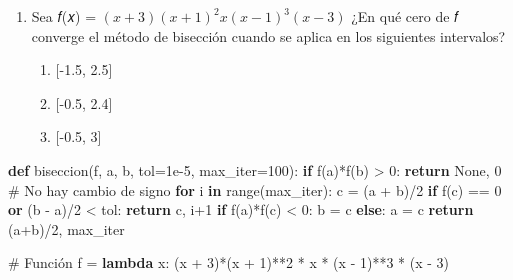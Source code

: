 \documentclass[
  english,
  letterpaper,
  DIV=11,
  numbers=noendperiod]{scrartcl}
\newenvironment{Shaded}{\begin{snugshade}}{\end{snugshade}}
\newcommand{\BuiltInTok}[1]{\textcolor[rgb]{0.00,0.23,0.31}{#1}}
\newcommand{\CommentTok}[1]{\textcolor[rgb]{0.37,0.37,0.37}{#1}}
\newcommand{\ControlFlowTok}[1]{\textcolor[rgb]{0.00,0.23,0.31}{\textbf{#1}}}
\newcommand{\DecValTok}[1]{\textcolor[rgb]{0.68,0.00,0.00}{#1}}
\newcommand{\FloatTok}[1]{\textcolor[rgb]{0.68,0.00,0.00}{#1}}
\newcommand{\KeywordTok}[1]{\textcolor[rgb]{0.00,0.23,0.31}{\textbf{#1}}}
\newcommand{\NormalTok}[1]{\textcolor[rgb]{0.00,0.23,0.31}{#1}}
\newcommand{\OperatorTok}[1]{\textcolor[rgb]{0.37,0.37,0.37}{#1}}
\newcommand{\VariableTok}[1]{\textcolor[rgb]{0.07,0.07,0.07}{#1}}
\begin{document}
\begin{enumerate}
\def\labelenumi{\arabic{enumi}.}
\setcounter{enumi}{4}
\item
  Sea 𝑓(𝑥) = \((𝑥 + 3)(𝑥 + 1)^2 x (x-1)^3 (x-3)\) ¿En qué cero de 𝑓
  converge el método de bisección cuando se aplica en los siguientes
  intervalos?

  \begin{enumerate}
  \def\labelenumii{\alph{enumii}.}
  \item
    {[}-1.5, 2.5{]}
  \item
    {[}-0.5, 2.4{]}
  \item
    {[}-0.5, 3{]}
  \end{enumerate}
\end{enumerate}

\begin{Shaded}
\begin{Highlighting}[]
\KeywordTok{def}\NormalTok{ biseccion(f, a, b, tol}\OperatorTok{=}\FloatTok{1e{-}5}\NormalTok{, max\_iter}\OperatorTok{=}\DecValTok{100}\NormalTok{):}
    \ControlFlowTok{if}\NormalTok{ f(a)}\OperatorTok{*}\NormalTok{f(b) }\OperatorTok{\textgreater{}} \DecValTok{0}\NormalTok{:}
        \ControlFlowTok{return} \VariableTok{None}\NormalTok{, }\DecValTok{0}  \CommentTok{\# No hay cambio de signo}
    \ControlFlowTok{for}\NormalTok{ i }\KeywordTok{in} \BuiltInTok{range}\NormalTok{(max\_iter):}
\NormalTok{        c }\OperatorTok{=}\NormalTok{ (a }\OperatorTok{+}\NormalTok{ b)}\OperatorTok{/}\DecValTok{2}
        \ControlFlowTok{if}\NormalTok{ f(c) }\OperatorTok{==} \DecValTok{0} \KeywordTok{or}\NormalTok{ (b }\OperatorTok{{-}}\NormalTok{ a)}\OperatorTok{/}\DecValTok{2} \OperatorTok{\textless{}}\NormalTok{ tol:}
            \ControlFlowTok{return}\NormalTok{ c, i}\OperatorTok{+}\DecValTok{1}
        \ControlFlowTok{if}\NormalTok{ f(a)}\OperatorTok{*}\NormalTok{f(c) }\OperatorTok{\textless{}} \DecValTok{0}\NormalTok{:}
\NormalTok{            b }\OperatorTok{=}\NormalTok{ c}
        \ControlFlowTok{else}\NormalTok{:}
\NormalTok{            a }\OperatorTok{=}\NormalTok{ c}
    \ControlFlowTok{return}\NormalTok{ (a}\OperatorTok{+}\NormalTok{b)}\OperatorTok{/}\DecValTok{2}\NormalTok{, max\_iter}

\CommentTok{\# Función}
\NormalTok{f }\OperatorTok{=} \KeywordTok{lambda}\NormalTok{ x: (x }\OperatorTok{+} \DecValTok{3}\NormalTok{)}\OperatorTok{*}\NormalTok{(x }\OperatorTok{+} \DecValTok{1}\NormalTok{)}\OperatorTok{**}\DecValTok{2} \OperatorTok{*}\NormalTok{ x }\OperatorTok{*}\NormalTok{ (x }\OperatorTok{{-}} \DecValTok{1}\NormalTok{)}\OperatorTok{**}\DecValTok{3} \OperatorTok{*}\NormalTok{ (x }\OperatorTok{{-}} \DecValTok{3}\NormalTok{)}


\end{Highlighting}
\end{Shaded}
\end{document}

